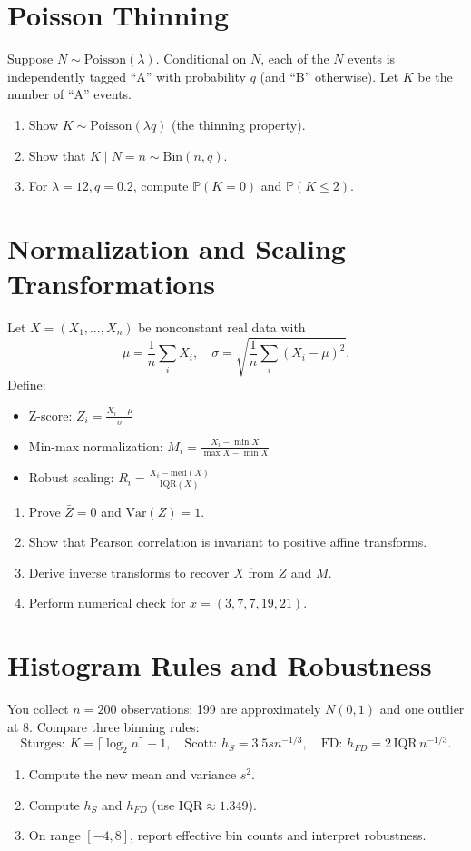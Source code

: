 \documentclass[12pt,a4paper]{article}
\begin{document}
\section{Poisson Thinning}
Suppose \( N \sim \mathrm{Poisson}(\lambda) \). Conditional on \( N \), each of the \( N \) events is independently tagged ``A'' with probability \( q \) (and ``B'' otherwise). Let \( K \) be the number of ``A'' events.
\begin{enumerate}[label=(\arabic*)]
\item Show \( K \sim \mathrm{Poisson}(\lambda q) \) (the thinning property).
\item Show that \( K \mid N = n \sim \mathrm{Bin}(n, q) \).
\item For \( \lambda = 12, q = 0.2 \), compute \( \mathbb{P}(K = 0) \) and \( \mathbb{P}(K \leq 2) \).
\end{enumerate}

\section{Normalization and Scaling Transformations}
Let \( X = (X_1, \ldots, X_n) \) be nonconstant real data with
\[
\mu = \frac{1}{n}\sum_i X_i, \quad \sigma = \sqrt{\frac{1}{n}\sum_i (X_i - \mu)^2}.
\]
Define:
\begin{itemize}
    \item Z-score: \( Z_i = \frac{X_i - \mu}{\sigma} \)
    \item Min-max normalization: \( M_i = \frac{X_i - \min X}{\max X - \min X} \)
    \item Robust scaling: \( R_i = \frac{X_i - \mathrm{med}(X)}{\mathrm{IQR}(X)} \)
\end{itemize}
\begin{enumerate}[label=(\alph*)]
\item Prove \( \bar{Z} = 0 \) and \( \mathrm{Var}(Z) = 1 \).
\item Show that Pearson correlation is invariant to positive affine transforms.
\item Derive inverse transforms to recover \( X \) from \( Z \) and \( M \).
\item Perform numerical check for \( x = (3,7,7,19,21) \).
\end{enumerate}

\section{Histogram Rules and Robustness}
You collect \( n = 200 \) observations: 199 are approximately \( N(0,1) \) and one outlier at 8. Compare three binning rules:
\[
\text{Sturges: } K = \lceil \log_2 n \rceil + 1, \quad
\text{Scott: } h_S = 3.5s n^{-1/3}, \quad
\text{FD: } h_{FD} = 2\,\mathrm{IQR}\,n^{-1/3}.
\]
\begin{enumerate}[label=(\alph*)]
\item Compute the new mean and variance \( s^2 \).
\item Compute \( h_S \) and \( h_{FD} \) (use \( \mathrm{IQR} \approx 1.349 \)).
\item On range \([-4,8]\), report effective bin counts and interpret robustness.
\end{enumerate}
\end{document}
